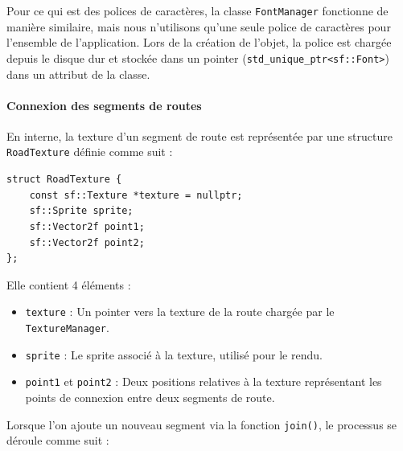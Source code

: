 Pour ce qui est des polices de caractères, la classe \texttt{FontManager} fonctionne de manière similaire, mais nous n'utilisons qu'une seule police de caractères pour l'ensemble de l'application.
Lors de la création de l'objet, la police est chargée depuis le disque dur et stockée dans un \gls{pointer} (\texttt{\gls{std_unique_ptr}<sf::Font>}\cite{cpp_reference_std_unique_ptr}) dans un attribut de la classe.

\paragraph{Connexion des segments de routes}
En interne, la texture d'un segment de route est représentée par une structure \texttt{RoadTexture} définie comme suit :

\begin{lstlisting}[style=CStyle,label={lst:struct_roadtexture}]
struct RoadTexture {
    const sf::Texture *texture = nullptr;
    sf::Sprite sprite;
    sf::Vector2f point1;
    sf::Vector2f point2;
};
\end{lstlisting}

Elle contient 4 éléments :
\begin{itemize}
    \item \texttt{texture} : Un \gls{pointer} vers la texture de la route chargée par le \texttt{TextureManager}.
    \item \texttt{\gls{sprite}} : Le \gls{sprite} associé à la texture, utilisé pour le rendu.
    \item \texttt{point1} et \texttt{point2} : Deux positions relatives à la texture représentant les points de connexion entre deux segments de route.
\end{itemize}

Lorsque l'on ajoute un nouveau segment via la fonction \texttt{join()}, le processus se déroule comme suit :

